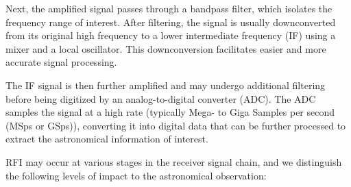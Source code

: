 Next, the amplified signal passes through a bandpass filter, which isolates the frequency range of interest. After filtering, the signal is usually downconverted from its original high frequency to a lower intermediate frequency (IF) using a mixer and a local oscillator. This downconversion facilitates easier and more accurate signal processing.

The IF signal is then further amplified and may undergo additional filtering before being digitized by an analog-to-digital converter (ADC). The ADC samples the signal at a high rate (typically Mega- to Giga Samples per second (MSps or GSps)), converting it into digital data that can be further processed to extract the astronomical information of interest.

RFI may occur at various stages in the receiver signal chain, and we distinguish the following levels of impact to the astronomical observation:
